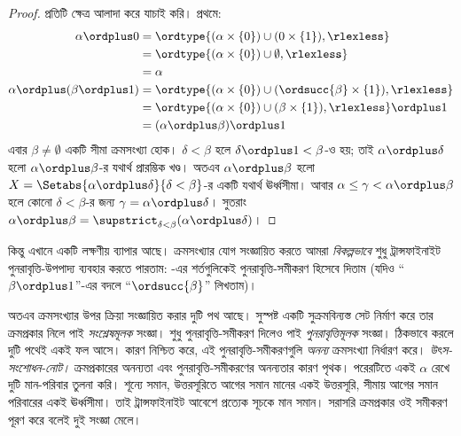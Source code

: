 \documentclass[../../../include/open-logic-section]{subfiles}
\begin{document}
\begin{proof}
প্রতিটি ক্ষেত্র আলাদা করে যাচাই করি। প্রথমে:
\begin{align*}
	\alpha \ordplus 0
	&= \ordtype{(\alpha \times \{0\}) \cup (0 \times \{1\}), \rlexless} \\
	&= \ordtype{(\alpha \times \{0\}) \cup \emptyset, \rlexless}\\
	&= \alpha\\
	\alpha \ordplus (\beta \ordplus 1)
	&= \ordtype{(\alpha\times \{0\}) \cup (\ordsucc{\beta}\times \{1\}), \rlexless} \\
	&= \ordtype{(\alpha\times \{0\}) \cup (\beta \times \{1\}), \rlexless} \ordplus 1\\
	&= (\alpha \ordplus \beta) \ordplus 1
\end{align*}
এবার $\beta \neq \emptyset$ একটি সীমা ক্রমসংখ্যা
হোক। $\delta < \beta$ হলে $\delta\ordplus 1 < \beta$-ও
হয়; তাই $\alpha \ordplus \delta$ হলো $\alpha
\ordplus \beta$-র যথার্থ প্রারম্ভিক খণ্ড। অতএব
$\alpha \ordplus \beta$ হলো
$X = \Setabs{\alpha \ordplus \delta}{\delta < \beta}$-র
একটি যথার্থ ঊর্ধ্বসীমা। আবার $\alpha \leq \gamma <
\alpha \ordplus \beta$ হলে কোনো $\delta < \beta$-র
জন্য $\gamma = \alpha \ordplus \delta$। সুতরাং
$\alpha \ordplus \beta = \supstrict_{\delta < \beta}
(\alpha\ordplus \delta)$।
\end{proof}

কিন্তু এখানে একটি লক্ষণীয় ব্যাপার আছে। ক্রমসংখ্যার যোগ
সংজ্ঞায়িত করতে আমরা \emph{বিকল্পভাবে} শুধু
ট্রান্সফাইনাইট পুনরাবৃত্তি-উপপাদ্য ব্যবহার করতে পারতাম:
-এর শর্তগুলিকেই পুনরাবৃত্তি-সমীকরণ
হিসেবে দিতাম (যদিও ``$\beta \ordplus 1$''-এর বদলে
``$\ordsucc{\beta}$'' লিখতাম)।

অতএব ক্রমসংখ্যার উপর ক্রিয়া সংজ্ঞায়িত করার দুটি পথ আছে।
সুস্পষ্ট একটি সুক্রমবিন্যস্ত সেট নির্মাণ করে তার ক্রমপ্রকার
নিলে পাই \emph{সংশ্লেষমূলক} সংজ্ঞা। শুধু
পুনরাবৃত্তি-সমীকরণ দিলেও পাই \emph{পুনরাবৃত্তিমূলক}
সংজ্ঞা। ঠিকভাবে করলে দুটি পথেই একই ফল আসে। কারণ
নিশ্চিত করে, এই পুনরাবৃত্তি-সমীকরণগুলি \emph{অনন্য}
ক্রমসংখ্যা নির্ধারণ করে।
\emph{উৎস-সংশোধন-নোট।} ক্রমপ্রকারের অনন্যতা এবং
পুনরাবৃত্তি-সমীকরণের অনন্যতার কারণ পৃথক। পরেরটিতে
একই $\alpha$ রেখে দুটি মান-পরিবার তুলনা করি। শূন্যে
সমান, উত্তরসূরিতে আগের সমান মানের একই উত্তরসূরি,
সীমায় আগের সমান পরিবারের একই ঊর্ধ্বসীমা। তাই
ট্রান্সফাইনাইট আবেশে প্রত্যেক সূচকে মান সমান।
সরাসরি ক্রমপ্রকার ওই সমীকরণ পূরণ করে বলেই দুই সংজ্ঞা মেলে।
\end{document}
